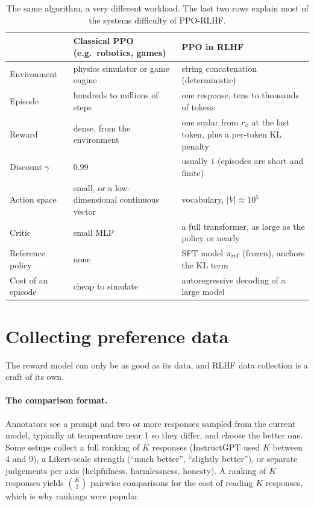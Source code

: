 \begin{table}[h]
\centering\small
\begin{tabularx}{\linewidth}{@{}lXX@{}}
\toprule
& \textbf{Classical PPO (e.g.\ robotics, games)} & \textbf{PPO in RLHF}\\
\midrule
Environment & physics simulator or game engine & string concatenation (deterministic)\\
Episode & hundreds to millions of steps & one response, tens to thousands of tokens\\
Reward & dense, from the environment & one scalar from $r_\phi$ at the last token, plus a per-token KL penalty\\
Discount $\gamma$ & $0.99$ & usually $1$ (episodes are short and finite)\\
Action space & small, or a low-dimensional continuous vector & vocabulary, $|V|\approx 10^5$\\
Critic & small MLP & a full transformer, as large as the policy or nearly\\
Reference policy & none & SFT model $\pi_{\text{ref}}$ (frozen), anchors the KL term\\
Cost of an episode & cheap to simulate & autoregressive decoding of a large model\\
\bottomrule
\end{tabularx}
\caption{The same algorithm, a very different workload. The last two rows explain most of the
systems difficulty of PPO-RLHF.}
\label{tab:rlhf:mapping}
\end{table}

\section{Collecting preference data}\label{sec:rlhf:data}

The reward model can only be as good as its data, and RLHF data collection is a craft of its own.

\paragraph{The comparison format.} Annotators see a prompt and two or more responses sampled from
the current model, typically at temperature near 1 so they differ, and choose the better one. Some setups
collect a full ranking of $K$ responses (InstructGPT used $K$ between 4 and 9), a Likert-scale
strength (``much better'', ``slightly better''), or separate judgements per axis (helpfulness,
harmlessness, honesty). A ranking of $K$ responses yields $\binom{K}{2}$ pairwise comparisons for
the cost of reading $K$ responses, which is why rankings were popular.

